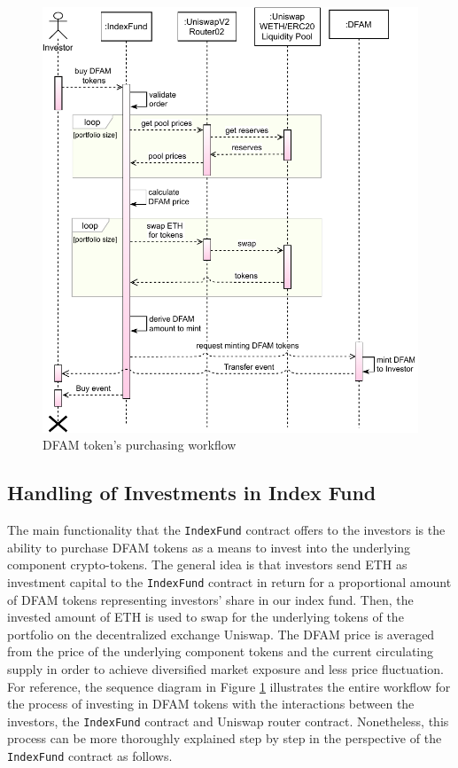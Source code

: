 \begin{figure}
    \centering
  \includegraphics[width=\linewidth]{figures/purchase-seq.pdf}
  \caption{DFAM token's purchasing workflow}
  \label{fig:seq_purchase}
\end{figure}

\subsection{Handling of Investments in Index Fund} \label{subsec:handlinginvestment}

The main functionality that the \texttt{IndexFund} contract offers to the investors is the ability to purchase DFAM tokens as a means to invest into the underlying component crypto-tokens. The general idea is that investors send ETH as investment capital to the \texttt{IndexFund} contract in return for a proportional amount of DFAM tokens representing investors' share in our index fund. Then, the invested amount of ETH is used to swap for the underlying tokens of the portfolio on the decentralized exchange Uniswap. The DFAM price is averaged from the price of the underlying component tokens and the current circulating supply in order to achieve diversified market exposure and less price fluctuation. For reference, the sequence diagram in Figure \ref{fig:seq_purchase} illustrates the entire workflow for the process of investing in DFAM tokens with the interactions between the investors, the \texttt{IndexFund} contract and Uniswap router contract. Nonetheless, this process can be more thoroughly explained step by step in the perspective of the \texttt{IndexFund} contract as follows.

